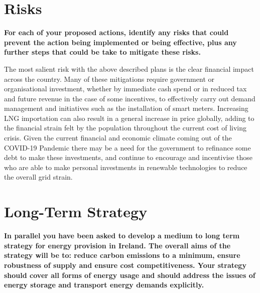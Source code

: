 \documentclass{article}
\begin{document}
    \section{Risks}
    {\scriptsize\textbf{For each of your proposed actions, identify any risks that could prevent the action being implemented or being effective, plus any further steps that could be take to mitigate these risks.}}
    \vspace{10pt}

    The most salient risk with the above described plans is the clear financial impact across the country. Many of these mitigations require government or organisational investment, whether by immediate cash spend or in reduced tax and future revenue in the case of some incentives, to effectively carry out demand management and initiatives such as the installation of smart meters. Increasing LNG importation can also result in a general increase in price globally, adding to the financial strain felt by the population throughout the current cost of living crisis. Given the current financial and economic climate coming out of the COVID-19 Pandemic there may be a need for the government to refinance some debt to make these investments, and continue to encourage and incentivise those who are able to make personal investments in renewable technologies to reduce the overall grid strain.
    \vspace{10pt}


    \section{Long-Term Strategy}
    {\scriptsize\textbf{In parallel you have been asked to develop a medium to long term strategy for energy provision in Ireland. The overall aims of the strategy will be to: reduce carbon emissions to a minimum, ensure robustness of supply and ensure cost competitiveness. Your strategy should cover all forms of energy usage and should address the issues of energy storage and transport energy demands explicitly.}}
    \vspace{10pt}
\end{document}
